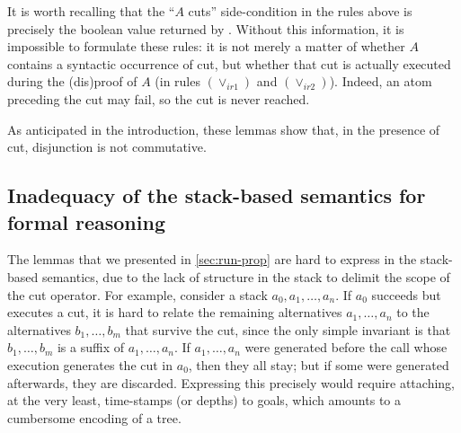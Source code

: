 \documentclass[sigplan,10pt,anonymous,review]{acmart}
\begin{document}



It is worth recalling that the ``$A$ cuts'' side-condition in the rules above is
precisely the boolean value returned by \run. Without this information, it is
impossible to formulate these rules: it is not merely a matter of whether $A$
contains a syntactic occurrence of cut, but whether that cut is actually
executed during the (dis)proof of $A$ (in rules $(\lor_{ir1})$ and $(\lor_{ir2})$).
Indeed, an atom preceding the cut may fail, so the cut is never reached.

As anticipated in the introduction, these lemmas show that, in the presence
of cut, disjunction is not commutative.




\subsection{Inadequacy of the stack-based semantics for formal reasoning}

The lemmas that we presented in
\cref{sec:run-prop} are hard to express in the stack-based semantics, due to the
lack of structure in the stack to delimit the scope of the cut operator. For
example, consider a stack $a_0, a_1, \dots, a_n$. If $a_0$ succeeds but executes a
cut, it is hard to relate the remaining alternatives $a_1, \dots, a_n$ to the
alternatives $b_1, \dots, b_m$ that survive the cut, since the only simple
invariant is that $b_1, \dots, b_m$ is a suffix of $a_1, \dots, a_n$. If
$a_1, \dots, a_n$ were generated before the call whose execution generates the cut
in $a_0$, then they all stay; but if some were generated afterwards, they are
discarded. Expressing this precisely would require attaching, at the very least,
time-stamps (or depths) to goals, which amounts to a cumbersome encoding of a
tree.
\end{document}
